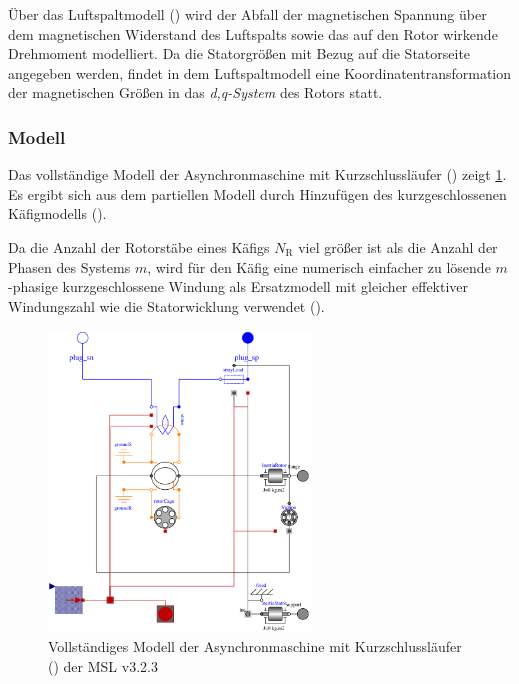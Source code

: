 Über das Luftspaltmodell () wird der Abfall der magnetischen Spannung über dem magnetischen Widerstand des Luftspalts sowie das auf den Rotor wirkende Drehmoment modelliert. Da die Statorgrößen mit Bezug auf die Statorseite angegeben werden, findet in dem Luftspaltmodell eine Koordinatentransformation der magnetischen Größen in das \emph{d,q-System} des Rotors statt.

\hypertarget{sec:modell-ASM}{%
\subsubsection{Modell}\label{sec:modell-ASM}}

Das vollständige Modell der Asynchronmaschine mit Kurzschlussläufer () zeigt \cref{fig:ASM_vollstaendig}. Es ergibt sich aus dem partiellen Modell durch Hinzufügen des kurzgeschlossenen Käfigmodells ().

Da die Anzahl der Rotorstäbe eines Käfigs $N_{\mathrm{R}}$  viel größer ist als die Anzahl der Phasen des Systems $m$, wird für den Käfig eine numerisch einfacher zu lösende $m$-phasige kurzgeschlossene Windung als Ersatzmodell mit gleicher effektiver Windungszahl wie die Statorwicklung verwendet (\cite[S. 194]{kralModelicaObjektorientierteModellbildung2019}).

\begin{figure}
\centering
\includegraphics[height=8cm]{Bilder/AIM_SquirrelCage.pdf}
\caption{Vollständiges Modell der Asynchronmaschine mit Kurzschlussläufer () der MSL v3.2.3}
\label{fig:ASM_vollstaendig}
\end{figure}

